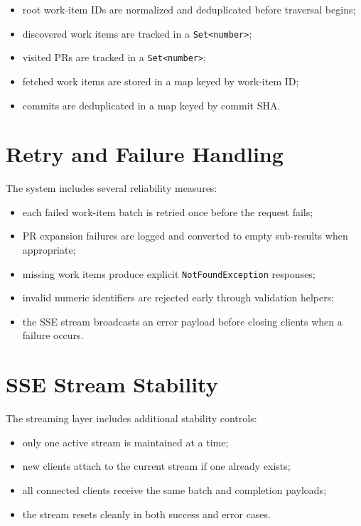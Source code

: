 \documentclass[12pt,a4paper]{report}
\newcommand{\code}[1]{\texttt{\small\color{codered}#1}}
\begin{document}
\begin{itemize}
  \item root work-item IDs are normalized and deduplicated before traversal begins;
  \item discovered work items are tracked in a \code{Set<number>};
  \item visited PRs are tracked in a \code{Set<number>};
  \item fetched work items are stored in a map keyed by work-item ID;
  \item commits are deduplicated in a map keyed by commit SHA.
\end{itemize}

\section{Retry and Failure Handling}

The system includes several reliability measures:

\begin{itemize}
  \item each failed work-item batch is retried once before the request fails;
  \item PR expansion failures are logged and converted to empty sub-results when appropriate;
  \item missing work items produce explicit \code{NotFoundException} responses;
  \item invalid numeric identifiers are rejected early through validation helpers;
  \item the SSE stream broadcasts an error payload before closing clients when a failure occurs.
\end{itemize}

\section{SSE Stream Stability}

The streaming layer includes additional stability controls:

\begin{itemize}
  \item only one active stream is maintained at a time;
  \item new clients attach to the current stream if one already exists;
  \item all connected clients receive the same batch and completion payloads;
  \item the stream resets cleanly in both success and error cases.
\end{itemize}
\end{document}
